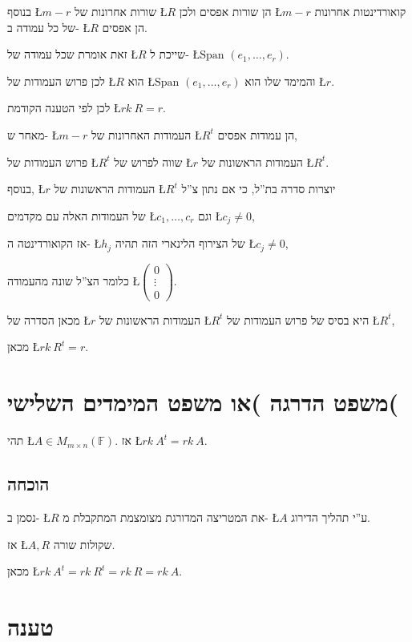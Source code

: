 \documentclass[english,hebrew]{article}
\newcommand{\matrmn}{M_{m\times n}(\mathbb{F})}
\newcommand{\spn}{\text{Span }}
\begin{document}
בנוסף \L{$m-r$} שורות אחרונות של \L{$R$} הן שורות אפסים ולכן \L{$m-r$}
קואורדינטות אחרונות של כל עמודה ב- \L{$R$} הן אפסים.

זאת אומרת שכל עמודה של \L{$R$} שייכת ל- \L{$\spn(e_{1},\dots,e_{r})$}.

לכן פרוש העמודות של \L{$R$} הוא \L{$\spn(e_{1},\dots,e_{r})$} והמימד
שלו הוא \L{$r$}.

לכן לפי הטענה הקודמת \L{$rk\:R=r$}.

מאחר ש- \L{$m-r$} העמודות האחרונות של \L{$R^{t}$} הן עמודות אפסים,

פרוש העמודות של \L{$R^{t}$} שווה לפרוש של \L{$r$} העמודות הראשונות
של \L{$R^{t}$}.

בנוסף, \L{$r$} העמודות הראשונות של \L{$R^{t}$} יוצרות סדרה בת\textquotedblright ל,
כי אם נתון צ\textquotedblright ל

של העמודות האלה עם מקדמים \L{$c_{1},\dots,c_{r}$} וגם \L{$c_{j}\neq0$}, 

אז הקואורדינטה ה- \L{$h_{j}$} של הצירוף הלינארי הזה תהיה \L{$c_{j}\neq0$},

כלומר הצ\textquotedblright ל שונה מהעמודה \L{$\begin{pmatrix}0\\
\vdots\\
0
\end{pmatrix}$}.

מכאן הסדרה של \L{$r$} העמודות הראשונות של \L{$R^{t}$} היא בסיס של
פרוש העמודות של \L{$R^{t}$},

מכאן \L{$rk\:R^{t}=r$}.

\section{משפט הדרגה )או משפט המימדים השלישי(}

תהי \L{$A\in\matrmn$}. אז \L{$rk\:A^{t}=rk\:A$}.

\subsection{הוכחה}

נסמן ב- \L{$R$} את המטריצה המדורגת מצומצמת המתקבלת מ- \L{$A$} ע\textquotedblright י
תהליך הדירוג.

אז \L{$A,R$} שקולות שורה.

מכאן \L{$rk\:A^{t}=rk\:R^{t}=rk\:R=rk\:A$}.

\section{טענה}
\end{document}
